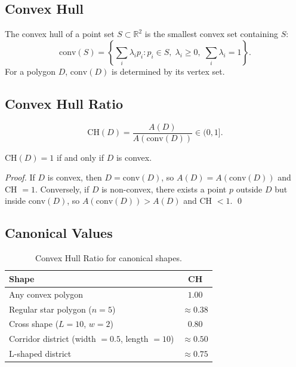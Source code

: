 \subsection{Convex Hull}

The convex hull of a point set $S \subset \mathbb{R}^2$ is the smallest convex
set containing $S$:
\[
  \text{conv}(S) = \left\{ \sum_i \lambda_i p_i : p_i \in S,\; \lambda_i \geq 0,\;
  \sum_i \lambda_i = 1 \right\}.
\]
For a polygon $D$, $\text{conv}(D)$ is determined by its vertex set.

\subsection{Convex Hull Ratio}

\begin{equation}
  \text{CH}(D) = \frac{A(D)}{A(\text{conv}(D))} \in (0, 1].
  \label{eq:ch}
\end{equation}

\begin{proposition}
  CH$(D) = 1$ if and only if $D$ is convex.
\end{proposition}

\begin{proof}
  If $D$ is convex, then $D = \text{conv}(D)$, so $A(D) = A(\text{conv}(D))$
  and CH $= 1$. Conversely, if $D$ is non-convex, there exists a point $p$
  outside $D$ but inside $\text{conv}(D)$, so $A(\text{conv}(D)) > A(D)$
  and CH $< 1$. \qed
\end{proof}

\subsection{Canonical Values}

\begin{table}[ht]
\centering
\caption{Convex Hull Ratio for canonical shapes.}
\label{tab:ch_canonical}
\begin{tabular}{lc}
\toprule
Shape & CH \\
\midrule
Any convex polygon & $1.00$ \\
Regular star polygon ($n=5$) & $\approx 0.38$ \\
Cross shape ($L = 10$, $w = 2$) & $0.80$ \\
Corridor district (width $= 0.5$, length $= 10$) & $\approx 0.50$ \\
L-shaped district & $\approx 0.75$ \\
\bottomrule
\end{tabular}
\end{table}

